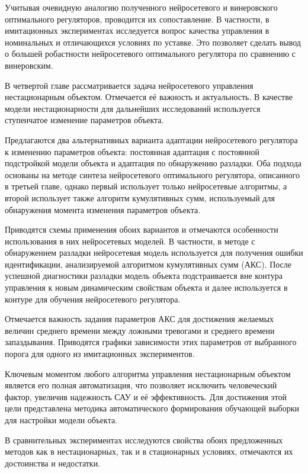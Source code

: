 Учитывая очевидную аналогию полученного нейросетевого и винеровского
оптимального регуляторов, проводится их сопоставление.  В частности, в
имитационных экспериментах исследуется вопрос качества управления в
номинальных и отличающихся условиях по уставке.  Это позволяет сделать
вывод о большей робастности нейросетевого оптимального регулятора по
сравнению с винеровским.


В четвертой главе рассматривается задача нейросетевого управления
нестационарным объектом.  Отмечается её важность и актуальность.  В
качестве модели нестационарности для дальнейших исследований
используется ступенчатое изменение параметров объекта.

Предлагаются два альтернативных варианта адаптации нейросетевого
регулятора к изменению параметров объекта: постоянная адаптация с
постоянной подстройкой модели объекта и адаптация по обнаружению
разладки.  Оба подхода основаны на методе синтеза нейросетевого
оптимального регулятора, описанного в третьей главе, однако первый
использует только нейросетевые алгоритмы, а второй использует также
алгоритм кумулятивных сумм, используемый для обнаружения момента
изменения параметров объекта.

Приводятся схемы применения обоих вариантов и отмечаются особенности
использования в них нейросетевых моделей.  В частности, в методе с
обнаружением разладки нейросетевая модель используется для получения
ошибки идентификации, анализируемой алгоритмом кумулятивных сумм
(АКС).  После успешной диагностики разладки модель объекта
подстраивается вне контура управления к новым динамическим свойствам
объекта и далее используется в контуре для обучения нейросетевого
регулятора.

Отмечается важность задания параметров АКС для достижения желаемых
величин среднего времени между ложными тревогами и среднего времени
запаздывания.  Приводятся графики зависимости этих параметров от
выбранного порога для одного из имитационных экспериментов.

Ключевым моментом любого алгоритма управления нестационарным объектом
является его полная автоматизация, что позволяет исключить
человеческий фактор, увеличив надежность САУ и её эффективность.  Для
достижения этой цели представлена методика автоматического
формирования обучающей выборки для настройки модели объекта.

В сравнительных экспериментах исследуются свойства обоих предложенных
методов как в нестационарных, так и в стационарных условиях,
отмечаются их достоинства и недостатки.

